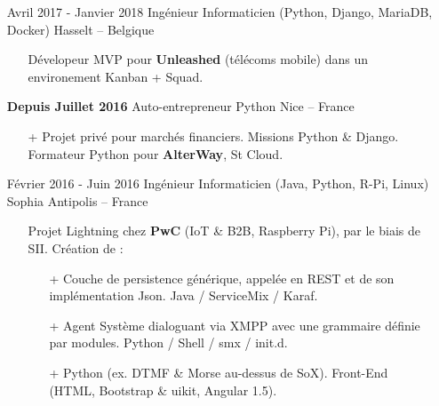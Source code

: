 \documentclass{res}
\begin{document}
\begin{resume}
\begin{itemize}
		\begin{itemize}
			\item[] Promotion de l'am\'elioration de la qualit\'e logicielle au sein d'\textbf{Around Media}.
			\begin{itemize}
				\item[+] Pipelines avec Jenkins \& GCE : 1200+ UE4 builds, releases, migration d'assets, clonage \& backups de VM.
				\item[+] Cr\'eation de \ifisanon \texttt{github.com/...} \textit{(Anonyme)}, \else \texttt{github.com/Mulugruntz/jam} \fi pour \'economiser mensuellement 500\euro+ / instance GCE.
			\end{itemize}
		\end{itemize}
		\item[] Avril 2017 - Janvier 2018 \tabto{5cm} Ing\'enieur Informaticien (Python, Django, MariaDB, Docker) \hfill Hasselt -- Belgique
		\begin{itemize}
			\item[] D\'evelopeur MVP pour \textbf{Unleashed} (t\'el\'ecoms mobile) dans un environement Kanban + Squad.
		\end{itemize}
		\item[] \textbf{Depuis Juillet 2016} \tabto{5cm} Auto-entrepreneur Python \hfill Nice -- France
		\begin{itemize}
			\item[+] Projet priv\'e pour march\'es financiers. Missions Python \& Django. Formateur Python pour \textbf{AlterWay}, St Cloud.
		\end{itemize}
		\item[] F\'evrier 2016 - Juin 2016 \tabto{5cm} Ing\'enieur Informaticien (Java, Python, R-Pi, Linux) \hfill Sophia Antipolis -- France
		\begin{itemize}
			\item[] Projet Lightning chez \textbf{PwC} (IoT \& B2B, Raspberry Pi), par le biais de SII. Cr\'eation de :
			\begin{itemize}
				\item[+] Couche de persistence g\'en\'erique, appel\'ee en REST et de son impl\'ementation Json. Java / ServiceMix / Karaf.
				\item[+] Agent Syst\`eme dialoguant via XMPP avec une grammaire d\'efinie par modules. Python / Shell / smx / init.d.
				\item[+] Python (ex. DTMF \& Morse au-dessus de SoX). Front-End (HTML, Bootstrap \& uikit, Angular 1.5).
			\end{itemize}
		\end{itemize}

\end{itemize}
\end{resume}
\end{document}
